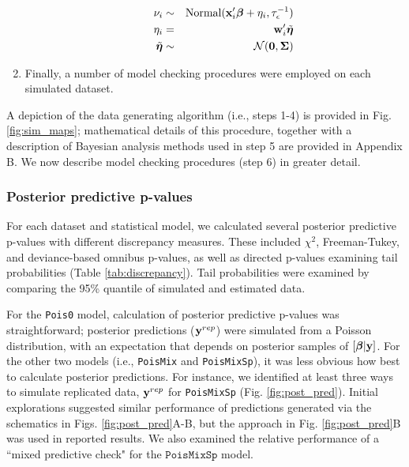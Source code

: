 \documentclass[12pt,english]{article}
\begin{document}
\begin{spacing}{1.9}
\begin{enumerate}
\begin{itemize}
\begin{eqnarray*}
      \nu_i & \sim & \textrm{Normal}({\bf x}_i^\prime \boldsymbol{\beta} + \eta_i, \tau_\epsilon^{-1}) \\
      \eta_i & = & {\bf w}_i^\prime \tilde{\boldsymbol{\eta}} \\
      \tilde{\boldsymbol{\eta}} & \sim & \mathcal{N}(\textbf{0},\boldsymbol{\Sigma}) \\
    \end{eqnarray*}
  \end{itemize}
\item Finally, a number of model checking procedures were employed on
  each simulated dataset.
\end{enumerate}
A depiction of the data generating algorithm (i.e., steps 1-4) is
provided in Fig. \ref{fig:sim_maps}; mathematical details of this
procedure, together with a description of Bayesian analysis methods
used in step 5 are provided in Appendix B.  We now describe model checking procedures (step 6) in
greater detail.

\subsubsection{Posterior predictive p-values}

For each dataset and statistical model, we calculated several posterior predictive
p-values with different discrepancy measures.  These included
$\chi^2$, Freeman-Tukey, and deviance-based omnibus p-values, as well
as directed p-values examining tail probabilities (Table
\ref{tab:discrepancy}). Tail probabilities were examined by comparing
the 95\% quantile of simulated and estimated data.

For the \texttt{Pois0} model, calculation of posterior predictive
p-values was straightforward; posterior predictions (${\bf y}^{rep}$)
were simulated from a Poisson distribution, with an expectation
that depends on posterior samples of $[\boldsymbol{\beta}|{\bf y}]$.  For the other
two models (i.e., \texttt{PoisMix} and \texttt{PoisMixSp}), it was
less obvious how best to calculate posterior predictions.  For
instance, we identified at least three ways to simulate replicated
data, ${\bf y}^{rep}$ for \texttt{PoisMixSp} (Fig. \ref{fig:post_pred}).
Initial explorations suggested similar performance of predictions
generated via the schematics in Figs. \ref{fig:post_pred}A-B, but the
approach in Fig. \ref{fig:post_pred}B was used in reported results.
We also examined the relative performance of a ``mixed predictive
check" \citep[][;
Fig. \ref{fig:post_pred}C]{MarshallSpiegelhalter2007} for the
$\texttt{PoisMixSp}$ model.


\end{spacing}
\end{document}
